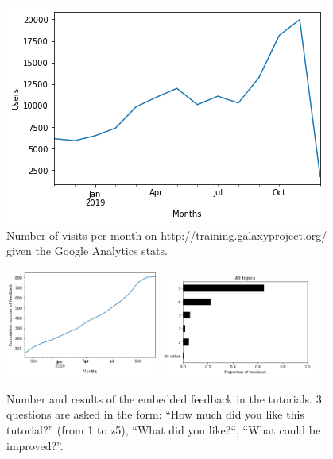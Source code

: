 \documentclass[10pt,letterpaper]{article}
\begin{document}
\begin{figure}[!ht]
	\centering
	\includegraphics[width=\textwidth]{images/visits-per-month.png}
	\caption{Number of visits per month on http://training.galaxyproject.org/ given the Google Analytics stats.\label{fig:visits}}
\end{figure}

\begin{figure}[!ht]
	\centering
	\includegraphics[width=0.45\textwidth]{images/feedback.png}
	\includegraphics[width=0.45\textwidth]{images/feedback-scores.png}
	\caption{Number and results of the embedded feedback in the tutorials. 3 questions are asked in the form: ``How much did you like this tutorial?'' (from 1 to z5), ``What did you like?``, ``What could be improved?''.\label{fig:feedback}}
\end{figure}
\end{document}
